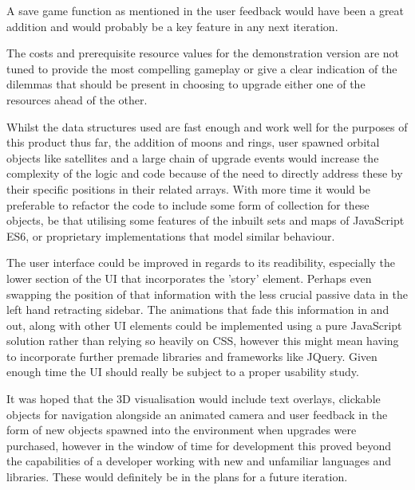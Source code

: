 \documentclass[twoside]{bhamthesis}
\begin{document}
A save game function as mentioned in the user feedback would have been a great addition and would probably be a key feature in any next iteration.

The costs and prerequisite resource values for the demonstration version are not tuned to provide the most compelling gameplay or give a clear indication of the dilemmas that should be present in choosing to upgrade either one of the resources ahead of the other.

Whilst the data structures used are fast enough and work well for the purposes of this product thus far, the addition of moons and rings, user spawned orbital objects like satellites and a large chain of upgrade events would increase the complexity of the logic and code because of the need to directly address these by their specific positions in their related arrays. With more time it would be preferable to refactor the code to include some form of collection for these objects, be that utilising some features of the inbuilt sets and maps of JavaScript ES6, or proprietary implementations that model similar behaviour.

The user interface could be improved in regards to its readibility, especially the lower section of the UI that incorporates the 'story' element. Perhaps even swapping the position of that information with the less crucial passive data in the left hand retracting sidebar. The animations that fade this information in and out, along with other UI elements could be implemented using a pure JavaScript solution rather than relying so heavily on CSS, however this might mean having to incorporate further premade libraries and frameworks like JQuery. Given enough time the UI should really be subject to a proper usability study.

It was hoped that the 3D visualisation would include text overlays, clickable objects for navigation alongside an animated camera and user feedback in the form of new objects spawned into the environment when upgrades were purchased, however in the window of time for development this proved beyond the capabilities of a developer working with new and unfamiliar languages and libraries. These would definitely be in the plans for a future iteration.
\end{document}
